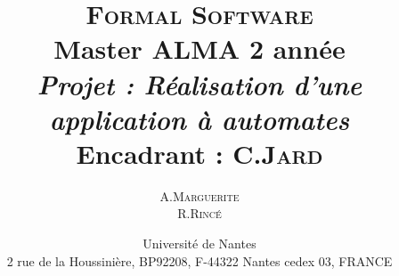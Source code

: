 \documentclass{report}
\title{ {\huge \textsc{Formal Software}} \\Master ALMA 2\up{eme} année \\\vspace{3cm} \emph{Projet : Réalisation d'une application à automates} \\ {\small Encadrant : C.\textsc{Jard}}\vspace{3cm}}
\author{A.\textsc{Marguerite}\\ R.\textsc{Rincé}\vspace{3cm}}
\date{Université de Nantes \\ 2 rue de la Houssinière, BP92208, F-44322 Nantes cedex 03, FRANCE}
\begin{document}
\maketitle
\renewcommand{\labelitemi}{$\bullet$} 

\clearpage

\tableofcontents
\clearpage

%


%



\listoffigures
%
%
\end{document}
